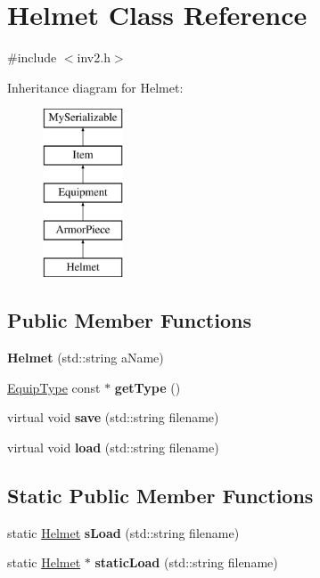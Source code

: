 \hypertarget{class_helmet}{}\section{Helmet Class Reference}
\label{class_helmet}


{\ttfamily \#include $<$inv2.\+h$>$}

Inheritance diagram for Helmet\+:\begin{figure}[H]
\begin{center}
\leavevmode
\includegraphics[height=5.000000cm]{class_helmet}
\end{center}
\end{figure}
\subsection*{Public Member Functions}
\begin{DoxyCompactItemize}
\item 
\hypertarget{class_helmet_a41c9d814d15f0f049412a61daef14c41}{}\label{class_helmet_a41c9d814d15f0f049412a61daef14c41} 
{\bfseries Helmet} (std\+::string a\+Name)
\item 
\hypertarget{class_helmet_a329be7131adb5eb57d6c17d4d9350f7a}{}\label{class_helmet_a329be7131adb5eb57d6c17d4d9350f7a} 
\hyperlink{class_equip_type}{Equip\+Type} const  $\ast$ {\bfseries get\+Type} ()
\item 
\hypertarget{class_helmet_a2027e81159b27f01c1d64108d1cce9df}{}\label{class_helmet_a2027e81159b27f01c1d64108d1cce9df} 
virtual void {\bfseries save} (std\+::string filename)
\item 
\hypertarget{class_helmet_ad40b91f9f61ea1d3c96e78e878360d7a}{}\label{class_helmet_ad40b91f9f61ea1d3c96e78e878360d7a} 
virtual void {\bfseries load} (std\+::string filename)
\end{DoxyCompactItemize}
\subsection*{Static Public Member Functions}
\begin{DoxyCompactItemize}
\item 
\hypertarget{class_helmet_aae0c609524b2503879464020ba29baf7}{}\label{class_helmet_aae0c609524b2503879464020ba29baf7} 
static \hyperlink{class_helmet}{Helmet} {\bfseries s\+Load} (std\+::string filename)
\item 
\hypertarget{class_helmet_a69cd0b8fab7db03947d9825060b2fd0c}{}\label{class_helmet_a69cd0b8fab7db03947d9825060b2fd0c} 
static \hyperlink{class_helmet}{Helmet} $\ast$ {\bfseries static\+Load} (std\+::string filename)
\end{DoxyCompactItemize}
